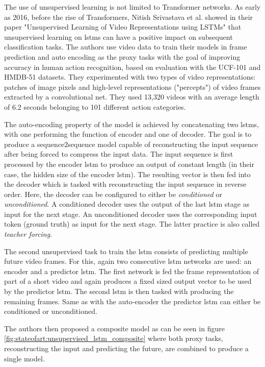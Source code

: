 The use of unsupervised learning is not limited to Transformer networks. As early as 2016, before the rise of Transformers, Nitish Srivastava et al. showed in their paper "Unsupervised Learning of Video Representations using LSTMs" \cite{unsupervised_learning_lstms} that unsupervised learning on \glspl{lstm} can have a positive impact on subsequent classification tasks. The authors use video data to train their models in frame prediction and auto encoding as the proxy tasks with the goal of improving accuracy in human action recognition, based on evaluation with the UCF-101 and
HMDB-51 datasets. They experimented with two types of video representations: patches of image pixels and high-level representations ("percepts") of video frames extracted by a convolutional net. They used 13,320 videos with an average length of 6.2 seconds belonging to 101 different action categories. \par
The auto-encoding property of the model is achieved by concatenating two \glspl{lstm}, with one performing the function of encoder and one of decoder. The goal is to produce a sequence2sequence model capable of reconstructing the input sequence after being forced to compress the input data. The input sequence is first processed by the encoder \gls{lstm} to produce an output of constant length (in their case, the hidden size of the encoder \gls{lstm}). The resulting vector is then fed into the decoder which is tasked with reconstructing the input sequence in reverse order. Here, the decoder can be configured to either be \textit{conditioned} or \textit{unconditioned}. A conditioned decoder uses the output of the last \gls{lstm} stage as input for the next stage. An unconditioned decoder uses the corresponding input token (ground truth) as input for the next stage. The latter practice is also called \textit{teacher forcing}. \par
The second unsupervised task to train the \gls{lstm} consists of predicting multiple future video frames. For this, again two consecutive \gls{lstm} networks are used: an encoder and a predictor \gls{lstm}. The first network is fed the frame representation of part of a short video and again produces a fixed sized output vector to be used by the predictor \gls{lstm}. The second \gls{lstm} is then tasked with producing the remaining frames. Same as with the auto-encoder the predictor \gls{lstm} can either be conditioned or unconditioned. \par
The authors then proposed a composite model as can be seen in figure \ref{fig:stateofart:unsupervised_lstm_composite} where both proxy tasks, reconstructing the input and predicting the future, are combined to produce a single model.


